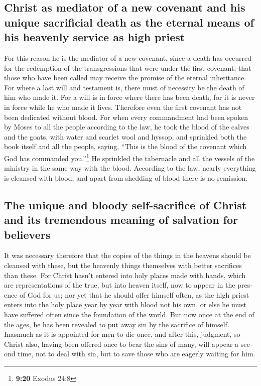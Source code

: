 \begin{paracol}{2}
\begin{otherlanguage}{english}
{\subsection{Christ as mediator of a new covenant and his unique
sacrificial death as the eternal means of his heavenly service as high
priest}\label{christ-as-mediator-of-a-new-covenant-and-his-unique-sacrificial-death-as-the-eternal-means-of-his-heavenly-service-as-high-priest}}

 For this reason he is the mediator of a new covenant,
since a death has occurred for the redemption of the transgressions that
were under the first covenant, that those who have been called may
receive the promise of the eternal inheritance.  For
where a last will and testament is, there must of necessity be the death
of him who made it.  For a will is in force where there
has been death, for it is never in force while he who made it lives.
 Therefore even the first covenant has not been dedicated
without blood.  For when every commandment had been
spoken by Moses to all the people according to the law, he took the
blood of the calves and the goats, with water and scarlet wool and
hyssop, and sprinkled both the book itself and all the people,
 saying, ``This is the blood of the covenant which God
has commanded you.''\footnote{\textbf{9:20} Exodus 24:8} 
He sprinkled the tabernacle and all the vessels of the ministry in the
same way with the blood.  According to the law, nearly
everything is cleansed with blood, and apart from shedding of blood
there is no remission.

\hypertarget{the-unique-and-bloody-self-sacrifice-of-christ-and-its-tremendous-meaning-of-salvation-for-believers}{%
\subsection{The unique and bloody self-sacrifice of Christ and its
tremendous meaning of salvation for
believers}\label{the-unique-and-bloody-self-sacrifice-of-christ-and-its-tremendous-meaning-of-salvation-for-believers}}

 It was necessary therefore that the copies of the things
in the heavens should be cleansed with these, but the heavenly things
themselves with better sacrifices than these.  For Christ
hasn't entered into holy places made with hands, which are
representations of the true, but into heaven itself, now to appear in
the presence of God for us;  nor yet that he should offer
himself often, as the high priest enters into the holy place year by
year with blood not his own,  or else he must have
suffered often since the foundation of the world. But now once at the
end of the ages, he has been revealed to put away sin by the sacrifice
of himself.  Inasmuch as it is appointed for men to die
once, and after this, judgment,  so Christ also, having
been offered once to bear the sins of many, will appear a second time,
not to deal with sin, but to save those who are eagerly waiting for him.


\end{otherlanguage}
\end{paracol}
